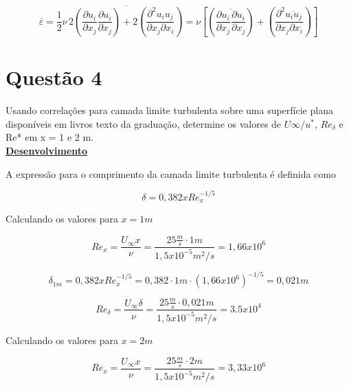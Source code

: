\documentclass[12pt]{article}
\begin{document}
\begin{equation}
	\overline{\varepsilon} = \frac{1}{2} \nu \, \overline{2\left( \frac{\partial u_i}{\partial x_j}\frac{\partial u_i}{\partial x_j}  \right) + 2\left(  \frac{\partial ^2 u_i u_j}{\partial x_j \partial x_i} \right)} = \nu  \left[ \left( \overline{\frac{\partial u_i}{\partial x_j}\frac{\partial u_i}{\partial x_j}  }\right) + \left(  \frac{\partial ^2 \overline{u_i u_j}}{\partial x_j \partial x_i} \right)\right] 
\end{equation}

\section*{Questão 4}



Usando correlações para camada limite turbulenta sobre uma superfície plana disponíveis em livros texto da graduação, determine os valores de $U\infty/u^*$, $Re_\delta$ e Re* em x = 1 e 2 m.\\

\textbf{\underline{Desenvolvimento}}

A expressão para o comprimento da camada limite turbulenta é definida como

\begin{equation}
	\delta = 0,382 x Re_x^{-1/5}
\end{equation}


Calculando os valores para $x=1m$

\begin{equation}
	Re_x = \frac{U_\infty x}{\nu} = \frac{25 \frac{m}{s} \cdot 1m}{1,5 x 10 ^{-5} m^2 / s} = 1,66 x 10 ^ {6}
\end{equation}

\begin{equation}
	\delta_{1m}= 0,382 x Re_x^{-1/5} = 0,382 \cdot 1m \cdot(1,66 x 10 ^ {6})^{-1/5} = 0,021 m
\end{equation}

\begin{equation}
	Re_\delta = \frac{U_\infty \delta}{\nu} = \frac{25 \frac{m}{s} \cdot 0,021m}{1,5 x 10 ^{-5} m^2 / s} = 3.5 x 10 ^ 4
\end{equation}

Calculando os valores para $x=2m$

\begin{equation}
	Re_x = \frac{U_\infty x}{\nu} = \frac{25 \frac{m}{s} \cdot 2m}{1,5 x 10 ^{-5} m^2 / s} = 3,33 x 10 ^ {6}
\end{equation}
\end{document}
